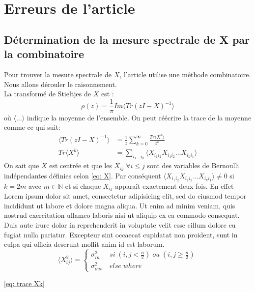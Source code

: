\section{Erreurs de l'article}
\subsection{Détermination de la mesure spectrale de X par la combinatoire}
Pour trouver la mesure spectrale de $X$, l'article utilise une méthode combinatoire.
Nous allons dérouler le raisonnement.\\
La transformé de Stieltjes de $X$ est :
\begin{equation}
	\rho(z) = \frac{1}{\pi} Im\langle Tr(zI - X)^{-1}\rangle
\end{equation}
où $\langle \dots \rangle$ indique la moyenne de l'ensemble.
On peut réécrire la trace de la moyenne comme ce qui suit: 
\begin{align}
	\langle Tr(zI - X)^{-1}\rangle &= \frac{1}{z}\sum_{k=0}^{\infty} \frac{Tr\langle X^k\rangle}{z^k} \\
	Tr\langle X^k\rangle &= \sum_{i_1\dots i_k}\langle X_{i_1i_2}X_{i_1i_2}\dots X_{i_ki_1}\rangle \label{eq: trace Xk}
\end{align}
On sait que $X$ est centrée et que les $X_{ij} \; \forall i\leq j$ sont des variables de Bernoulli indépendantes définies celon \eqref{eq: X}.
Par conséquent $\langle X_{i_1i_2}X_{i_1i_2}\dots X_{i_ki_1}\rangle \neq 0$ si $k = 2m$ avec $m\in \mathbb{N}$ et si chaque $X_{ij}$ apparaît exactement deux fois.
En effet
Lorem ipsum dolor sit amet, consectetur adipisicing elit, sed do eiusmod
tempor incididunt ut labore et dolore magna aliqua. Ut enim ad minim veniam,
quis nostrud exercitation ullamco laboris nisi ut aliquip ex ea commodo
consequat. Duis aute irure dolor in reprehenderit in voluptate velit esse
cillum dolore eu fugiat nulla pariatur. Excepteur sint occaecat cupidatat non
proident, sunt in culpa qui officia deserunt mollit anim id est laborum.
\begin{equation}
	\langle X_{ij}^2\rangle = \left\{
	\begin{array}{lr}
		\sigma_{in}^2  &\; si \; (i,j < \frac{n}{2}) \; ou \; (i,j \ge \frac{n}{2}) \\
		\sigma_{out}^2 &\; else \; where
	\end{array}
\right.\nonumber
\end{equation}

\eqref{eq: trace Xk}

